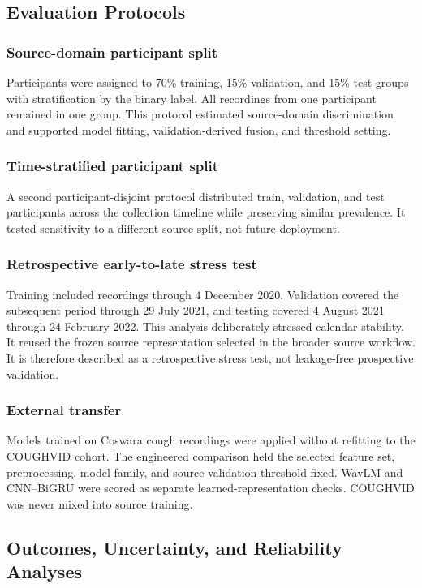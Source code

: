 \documentclass[journal]{IEEEtran}
\begin{document}
\subsection{Evaluation Protocols}

\subsubsection{Source-domain participant split}
Participants were assigned to 70\% training, 15\% validation, and 15\% test groups with stratification by the binary label. All recordings from one participant remained in one group. This protocol estimated source-domain discrimination and supported model fitting, validation-derived fusion, and threshold setting.

\subsubsection{Time-stratified participant split}
A second participant-disjoint protocol distributed train, validation, and test participants across the collection timeline while preserving similar prevalence. It tested sensitivity to a different source split, not future deployment.

\subsubsection{Retrospective early-to-late stress test}
Training included recordings through 4 December 2020. Validation covered the subsequent period through 29 July 2021, and testing covered 4 August 2021 through 24 February 2022. This analysis deliberately stressed calendar stability. It reused the frozen source representation selected in the broader source workflow. It is therefore described as a retrospective stress test, not leakage-free prospective validation.

\subsubsection{External transfer}
Models trained on Coswara cough recordings were applied without refitting to the COUGHVID cohort. The engineered comparison held the selected feature set, preprocessing, model family, and source validation threshold fixed. WavLM and CNN--BiGRU were scored as separate learned-representation checks. COUGHVID was never mixed into source training.

\subsection{Outcomes, Uncertainty, and Reliability Analyses}
\end{document}
